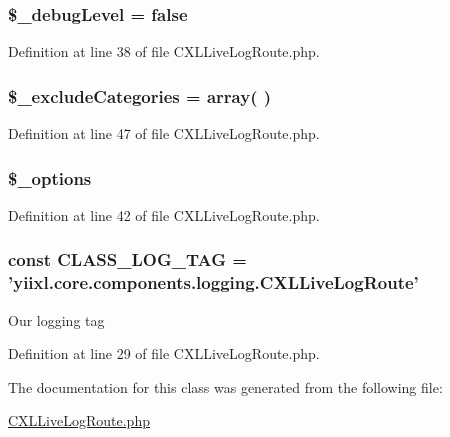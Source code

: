 \hypertarget{classCXLLiveLogRoute_a6c76d7fa9253beae006eaaf4e3038ce9}{
\subsubsection[{\$\_\-debugLevel}]{\setlength{\rightskip}{0pt plus 5cm}\$\_\-debugLevel = false}}
\label{classCXLLiveLogRoute_a6c76d7fa9253beae006eaaf4e3038ce9}


Definition at line 38 of file CXLLiveLogRoute.php.

\hypertarget{classCXLLiveLogRoute_a9c4b2e98f2d0c9401bc839d5104985ce}{
\subsubsection[{\$\_\-excludeCategories}]{\setlength{\rightskip}{0pt plus 5cm}\$\_\-excludeCategories = array( )}}
\label{classCXLLiveLogRoute_a9c4b2e98f2d0c9401bc839d5104985ce}


Definition at line 47 of file CXLLiveLogRoute.php.

\hypertarget{classCXLLiveLogRoute_a1bebdc689c84eee59ad24c77e5531762}{
\subsubsection[{\$\_\-options}]{\setlength{\rightskip}{0pt plus 5cm}\$\_\-options}}
\label{classCXLLiveLogRoute_a1bebdc689c84eee59ad24c77e5531762}


Definition at line 42 of file CXLLiveLogRoute.php.

\hypertarget{classCXLLiveLogRoute_aa607ab5e557e6ebb60b85c5a20ad067f}{
\subsubsection[{CLASS\_\-LOG\_\-TAG}]{\setlength{\rightskip}{0pt plus 5cm}const {\bf CLASS\_\-LOG\_\-TAG} = 'yiixl.core.components.logging.CXLLiveLogRoute'}}
\label{classCXLLiveLogRoute_aa607ab5e557e6ebb60b85c5a20ad067f}
Our logging tag 

Definition at line 29 of file CXLLiveLogRoute.php.



The documentation for this class was generated from the following file:\begin{DoxyCompactItemize}
\item 
\hyperlink{CXLLiveLogRoute_8php}{CXLLiveLogRoute.php}\end{DoxyCompactItemize}
